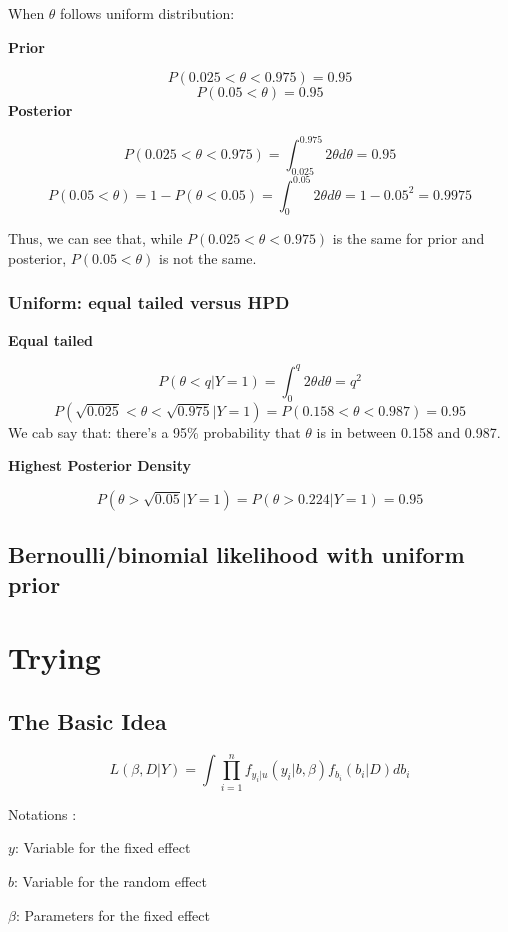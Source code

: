 \documentclass[]{book}
\begin{document}
When \(\theta\) follows uniform distribution:

\textbf{Prior}

\[P(0.025 <\theta<0.975)=0.95\] \[P( 0.05< \theta )=0.95\]
\textbf{Posterior}

\[P(0.025<\theta<0.975)=\int_{0.025}^{0.975} 2\theta d\theta=0.95\]
\[P(0.05<\theta)=1-P(\theta <0.05)=\int_{0}^{0.05} 2\theta d\theta=1-0.05^2=0.9975\]

Thus, we can see that, while \(P(0.025<\theta<0.975)\) is the same for
prior and posterior, \(P(0.05<\theta)\) is not the same.

\subsection{Uniform: equal tailed versus
HPD}\label{uniform-equal-tailed-versus-hpd}

\textbf{Equal tailed}

\[P(\theta < q|Y=1)=\int_0^q 2\theta d\theta=q^2\]
\[P(\sqrt{0.025}<\theta<\sqrt{0.975}|Y=1)=P(0.158<\theta<0.987)=0.95\]
We cab say that: there's a 95\% probability that \(\theta\) is in
between 0.158 and 0.987.

\textbf{Highest Posterior Density}

\[P(\theta > \sqrt{0.05}|Y=1)=P(\theta >0.224|Y=1)=0.95\]

\section{Bernoulli/binomial likelihood with uniform
prior}\label{bernoullibinomial-likelihood-with-uniform-prior}

\chapter{Trying}\label{trying}

\section{The Basic Idea}\label{the-basic-idea}

\[L(\beta,D|Y)=\int \prod_{i=1}^{n} f_{y_i|u}(y_i|b,\beta)f_{b_i}(b_i|D)db_i\]

Notations :

\(y\): Variable for the fixed effect

\(b\): Variable for the random effect

\(\beta\): Parameters for the fixed effect
\end{document}
